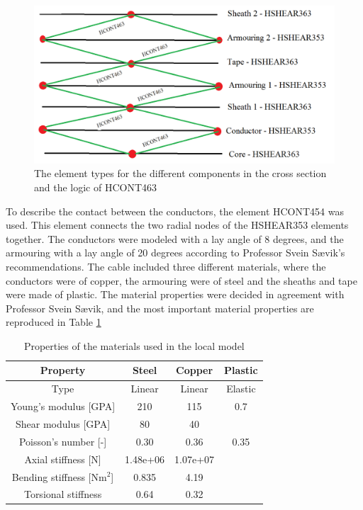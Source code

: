\begin{figure}[H]
\centering
\includegraphics[scale=0.5]{figures/contact}
\caption[$\; \:$ Logic of HCONT463]{The element types for the different components in the cross section and the logic of HCONT463}
 \label{fig:contact}
\end{figure}

\noindent To describe the contact between the conductors, the element HCONT454 was used. This element connects the two radial nodes of the HSHEAR353 elements together.\newline
\newline
The conductors were modeled with a lay angle of 8 degrees, and the armouring with a lay angle of 20 degrees according to Professor Svein Sævik's recommendations. \newline
\newline
The cable included three different materials, where the conductors were of copper, the armouring were of steel and the sheaths and tape were made of plastic. The material properties were decided in agreement with Professor Svein Sævik, and the most important material properties are reproduced in Table \ref{table:matprop}
\begin{table} [H]
\centering
\begin{tabular}{ |c|c|c|c|}
\hline
Property &Steel & Copper  & Plastic \\
 \hline
 \hline
Type & Linear & Linear & Elastic\\
Young's modulus [GPA] & 210 & 115 & 0.7\\
Shear modulus [GPA]& 80 & 40 &  \\
Poisson's number [-]& 0.30 & 0.36 & 0.35\\
Axial stiffness [N]& 1.48e+06 & 1.07e+07 & \\
Bending stiffness [Nm$^2$] & 0.835 & 4.19 &\\
Torsional stiffness & 0.64 & 0.32&\\
 \hline
\end{tabular}
\caption{Properties of the materials used in the local model}
\label{table:matprop}
\end{table}


